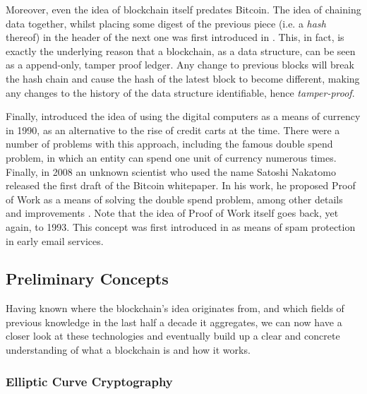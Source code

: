 Moreover, even the idea of blockchain itself predates Bitcoin. The idea of chaining data together,
whilst placing some digest of the previous piece (i.e. a \textit{hash} thereof) in the header of the
next one was first introduced in \cite{haberHowTimestampDigital1991}. This, in fact, is exactly the
underlying reason that a blockchain, as a data structure, can be seen as a append-only, tamper proof
ledger. Any change to previous blocks will break the hash chain and cause the hash of the latest
block to become different, making any changes to the history of the data structure identifiable,
hence \textit{tamper-proof}.

Finally, \cite{chaumUntraceableElectronicCash1990} introduced the idea of using the digital
computers as a means of currency in 1990, as an alternative to the rise of credit carts at the time.
There were a number of problems with this approach, including the famous double spend problem, in
which an entity can spend one unit of currency numerous times. Finally, in 2008 an unknown scientist
who used the name Satoshi Nakatomo released the first draft of the Bitcoin whitepaper. In his work,
he proposed Proof of Work as a means of solving the double spend problem, among other details and
improvements \cite{nakamotoBitcoinPeertoPeerElectronic}. Note that the idea of Proof of Work itself
goes back, yet again, to 1993. This concept was first introduced in
\cite{dworkPricingProcessingCombatting1993} as means of spam protection in early email services.

\subsection{Preliminary Concepts} \label{chap_bg:sec:preliminary}

Having known where the blockchain's idea originates from, and which fields of previous knowledge in
the last half a decade it aggregates, we can now have a closer look at these technologies and
eventually build up a clear and concrete understanding of what a blockchain is and how it works.

\subsubsection{Elliptic Curve Cryptography} \label{chap_bg:subsec:ecc}


